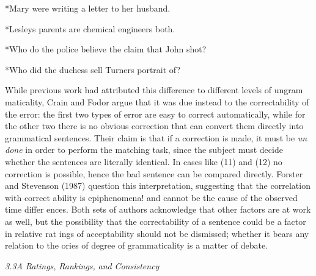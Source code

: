 \setcounter{listWWNumxlviiileveli}{8}
\begin{listWWNumxlviiileveli}
\item 
\begin{styleTextbody}
*Mary were writing a letter to her husband.
\end{styleTextbody}


\item 
\begin{styleTextbody}
*Lesley{\textquotesingle}s parents are chemical engineers both.
\end{styleTextbody}


\item 
\begin{styleTextbody}
*Who do the police believe the claim that John shot?
\end{styleTextbody}


\item 
\begin{styleTextbody}
*Who did the duchess sell Turner{\textquotesingle}s portrait of?
\end{styleTextbody}


\end{listWWNumxlviiileveli}
\begin{styleTextbody}
While previous work had attributed this difference to different levels of ungram\- maticality, Crain and Fodor argue that it was due instead to the correctability of the error: the first two types of error are easy to correct automatically, while for the other two there is no obvious correction that can convert them directly into grammatical sentences. Their claim is that if a correction is made, it must be \textit{un\-}\textit{ }\textit{done}\textit{ }in order to perform the matching task, since the subject must decide whether the sentences are literally identical. In cases like (11) and (12) no correction is possible, hence the bad sentence can be compared directly. Forster and Stevenson (1987) question this interpretation, suggesting that the correlation with correct\- ability is epiphenomena! and cannot be the cause of the observed time differ\- ences. Both sets of authors acknowledge that other factors are at work as well, but the possibility that the correctability of a sentence could be a factor in relative rat\- ings of acceptability should not be dismissed; whether it bears any relation to the\- ories of degree of grammaticality is a matter of debate.
\end{styleTextbody}


\begin{styleStandard}
\textit{3.3A}\textit{ }\textit{Ratings,}\textit{ }\textit{Rankings,}\textit{ }\textit{and}\textit{ }\textit{Consistency}
\end{styleStandard}


